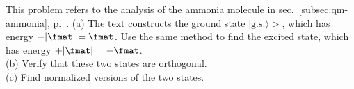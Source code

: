 This problem refers to the analysis of the ammonia molecule in sec.~\ref{subsec:qm-ammonia}, p.~\pageref{subsec:qm-ammonia}.
(a) The text constructs the ground state $|\text{g.s.}\rangle>$, which has energy $-|\fmat|=\fmat$. Use the
same method to find the excited state, which has energy $+|\fmat|=-\fmat$.\\
(b) Verify that these two states are orthogonal.\\
(c) Find normalized versions of the two states.
